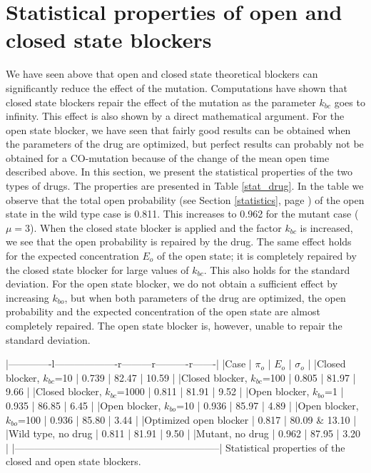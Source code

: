 {\bigskip


\section{Statistical properties of open and closed state blockers}
\label{stat1Ddrg}

We have seen above that open and closed state theoretical blockers can significantly reduce the effect of the mutation. Computations have shown that closed state blockers repair the effect of the mutation as the parameter $k_{bc}$ goes to infinity. This effect is also shown by a direct mathematical argument. For the open state blocker, we have seen that fairly good results can be obtained when the parameters of the drug are optimized, but perfect results can probably not be obtained for a CO-mutation because of the change of the mean open time described above.
In this section, we present the statistical properties of the two types of drugs. The properties are presented in Table \ref{stat_drug}. In the table we observe that the total open probability (see Section \ref{statistics}, page  \pageref{statistics}) of the open state in the wild type case is 0.811. This increases to 0.962 for the mutant case ($\mu=3$). When the closed state blocker is applied and the factor $k_{bc}$ is increased, we see that the open probability is repaired by the drug. The same effect holds for the expected concentration $E_o$ of the open state; it is completely repaired by the closed state blocker for large values of $k_{bc}$. This also holds for the standard deviation. For the open state blocker, we do not obtain a sufficient effect by increasing $k_{bo}$, but when both parameters of the drug are optimized, the open probability and the expected concentration of the open state are almost completely repaired. The open state blocker is, however, unable to repair the standard deviation. 



|-------------l-------------------r---------r----------r-------|
|Case                          | $\pi_o$ | $E_o$ | $\sigma_o$  |
|Closed blocker, $k_{bc}$=10   | 0.739   | 82.47 | 10.59       |
|Closed blocker, $k_{bc}$=100  | 0.805   | 81.97 | 9.66        |
|Closed blocker, $k_{bc}$=1000 | 0.811   | 81.91 | 9.52        |
|Open blocker, $k_{bo}$=1      | 0.935   | 86.85 | 6.45        |
|Open blocker, $k_{bo}$=10     | 0.936   | 85.97 | 4.89        |
|Open blocker, $k_{bo}$=100    | 0.936   | 85.80 | 3.44        |
|Optimized open blocker        | 0.817   | 80.09 & 13.10       |
|Wild type, no drug            | 0.811   | 81.91 | 9.50        |
|Mutant, no drug               | 0.962   | 87.95 | 3.20        |
|--------------------------------------------------------------|
Statistical properties of the closed and open state blockers. \label{stat_drug}



}
